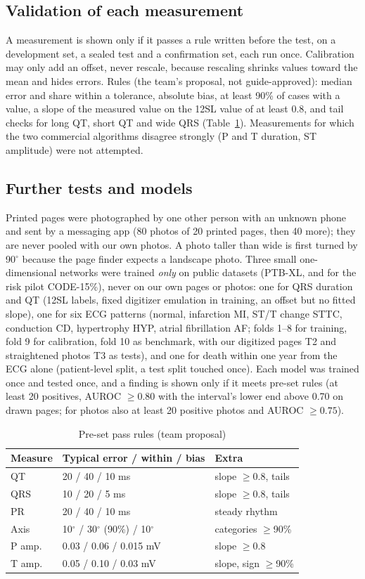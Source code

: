 \documentclass[conference]{IEEEtran}
\begin{document}
\subsection{Validation of each measurement}
A measurement is shown only if it passes a rule written before the test, on a development set, a sealed test and a confirmation set, each run once. Calibration may only add an offset, never rescale, because rescaling shrinks values toward the mean and hides errors. Rules (the team's proposal, not guide-approved): median error and share within a tolerance, absolute bias, at least 90\% of cases with a value, a slope of the measured value on the 12SL value of at least 0.8, and tail checks for long QT, short QT and wide QRS (Table~\ref{tab:rules}). Measurements for which the two commercial algorithms disagree strongly (P and T duration, ST amplitude) were not attempted.

\subsection{Further tests and models}
Printed pages were photographed by one other person with an unknown phone and sent by a messaging app (80 photos of 20 printed pages, then 40 more); they are never pooled with our own photos. A photo taller than wide is first turned by 90$^\circ$ because the page finder expects a landscape photo. Three small one-dimensional networks were trained \emph{only} on public datasets (PTB-XL, and for the risk pilot CODE-15\%), never on our own pages or photos: one for QRS duration and QT (12SL labels, fixed digitizer emulation in training, an offset but no fitted slope), one for six ECG patterns (normal, infarction MI, ST/T change STTC, conduction CD, hypertrophy HYP, atrial fibrillation AF; folds 1--8 for training, fold 9 for calibration, fold 10 as benchmark, with our digitized pages T2 and straightened photos T3 as tests), and one for death within one year from the ECG alone (patient-level split, a test split touched once). Each model was trained once and tested once, and a finding is shown only if it meets pre-set rules (at least 20 positives, AUROC $\ge0.80$ with the interval's lower end above 0.70 on drawn pages; for photos also at least 20 positive photos and AUROC $\ge0.75$).

\begin{table}[t]
\caption{Pre-set pass rules (team proposal)}
\label{tab:rules}
\centering
\small
\begin{tabular}{lll}
\toprule
Measure & Typical error / within / bias & Extra \\
\midrule
QT & 20 / 40 / 10 ms & slope $\ge$0.8, tails \\
QRS & 10 / 20 / 5 ms & slope $\ge$0.8, tails \\
PR & 20 / 40 / 10 ms & steady rhythm \\
Axis & 10$^\circ$ / 30$^\circ$ (90\%) / 10$^\circ$ & categories $\ge$90\% \\
P amp. & 0.03 / 0.06 / 0.015 mV & slope $\ge$0.8 \\
T amp. & 0.05 / 0.10 / 0.03 mV & slope, sign $\ge$90\% \\
\bottomrule
\end{tabular}
\end{table}
\end{document}
